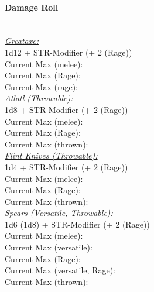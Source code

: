\documentclass[letterpaper,openany,oneside,twocolumn]{book}
\begin{document}
\paragraph*{Damage Roll}\hfill\\
\underline{\textit{Greataxe:}}\\
1d12 + STR-Modifier (+ 2 (Rage))\\
\indent Current Max (melee): \\
\indent Current Max (Rage): \\
\indent Current Max (rage): 
\\
\underline{\textit{Atlatl (Throwable):}}\\
1d8 + STR-Modifier (+ 2 (Rage))\\
\indent Current Max (melee): \\
\indent Current Max (Rage): \\
\indent Current Max (thrown): 
\\
\underline{\textit{Flint Knives (Throwable):}}\\
1d4 + STR-Modifier (+ 2 (Rage))\\
\indent Current Max (melee): \\
\indent Current Max (Rage): \\
\indent Current Max (thrown): 
\\
\underline{\textit{Spears (Versatile, Throwable):}}\\
1d6 (1d8) + STR-Modifier (+ 2 (Rage))\\
\indent Current Max (melee): \\
\indent Current Max (versatile): \\
\indent Current Max (Rage): \\
\indent Current Max (versatile, Rage): \\
\indent Current Max (thrown): 
\end{document}
